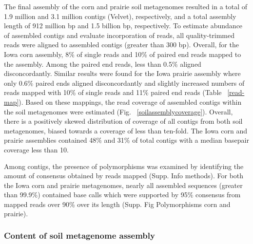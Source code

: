 \documentclass[11pt]{article} %
\begin{document}
The final assembly of the corn and prairie soil metagenomes resulted
in a total of 1.9 million and 3.1 million contigs (Velvet),
respectively, and a total assembly length of 912 million bp and 1.5
billion bp, respectively.  To estimate abundance of assembled contigs
and evaluate incorporation of reads, all quality-trimmed reads were
aligned to assembled contigs (greater than 300 bp).  Overall, for the
Iowa corn assembly, 8\% of single reads and 10\% of paired end reads
mapped to the assembly.  Among the paired end reads, less than 0.5\%
aligned disconcordantly.  Similar results were found for the Iowa
prairie assembly where only 0.6\% paired ends aligned disconcordantly
and slightly increased numbers of reads mapped with 10\% of single
reads and 11\% paired end reads (Table ~\ref{read-map}).  Based on
these mappings, the read coverage of assembled contigs within the soil
metagenomes were estimated (Fig. ~\ref{soilassemblycoverage}).
Overall, there is a positively skewed distribution of coverage of all
contigs from both soil metagenomes, biased towards a coverage of less
than ten-fold.  The Iowa corn and prairie assemblies contained 48\%
and 31\% of total contigs with a median basepair coverage less than
10.

Among contigs, the presence of polymorphisms was examined by
identifying the amount of consensus obtained by reads mapped
(Supp. Info methods).  For both the Iowa corn and prairie metagenomes,
nearly all assembled sequences (greater than 99.9\%) contained base
calls which were supported by 95\% consensus from mapped reads over
90\% over its length (Supp. Fig Polymorphisms corn and prairie).



\subsubsection{Content of soil metagenome assembly}

\end{document}
